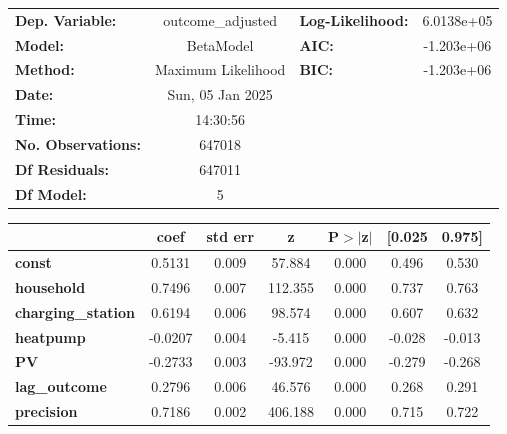 \begin{center}
\begin{tabular}{lclc}
\toprule
\textbf{Dep. Variable:}    & outcome\_adjusted  & \textbf{  Log-Likelihood:    } & 6.0138e+05  \\
\textbf{Model:}            &     BetaModel      & \textbf{  AIC:               } & -1.203e+06  \\
\textbf{Method:}           & Maximum Likelihood & \textbf{  BIC:               } & -1.203e+06  \\
\textbf{Date:}             &  Sun, 05 Jan 2025  & \textbf{                     } &             \\
\textbf{Time:}             &      14:30:56      & \textbf{                     } &             \\
\textbf{No. Observations:} &       647018       & \textbf{                     } &             \\
\textbf{Df Residuals:}     &       647011       & \textbf{                     } &             \\
\textbf{Df Model:}         &            5       & \textbf{                     } &             \\
\bottomrule
\end{tabular}
\begin{tabular}{lcccccc}
                           & \textbf{coef} & \textbf{std err} & \textbf{z} & \textbf{P$> |$z$|$} & \textbf{[0.025} & \textbf{0.975]}  \\
\midrule
\textbf{const}             &       0.5131  &        0.009     &    57.884  &         0.000        &        0.496    &        0.530     \\
\textbf{household}         &       0.7496  &        0.007     &   112.355  &         0.000        &        0.737    &        0.763     \\
\textbf{charging\_station} &       0.6194  &        0.006     &    98.574  &         0.000        &        0.607    &        0.632     \\
\textbf{heatpump}          &      -0.0207  &        0.004     &    -5.415  &         0.000        &       -0.028    &       -0.013     \\
\textbf{PV}                &      -0.2733  &        0.003     &   -93.972  &         0.000        &       -0.279    &       -0.268     \\
\textbf{lag\_outcome}      &       0.2796  &        0.006     &    46.576  &         0.000        &        0.268    &        0.291     \\
\textbf{precision}         &       0.7186  &        0.002     &   406.188  &         0.000        &        0.715    &        0.722     \\
\bottomrule
\end{tabular}
\end{center}